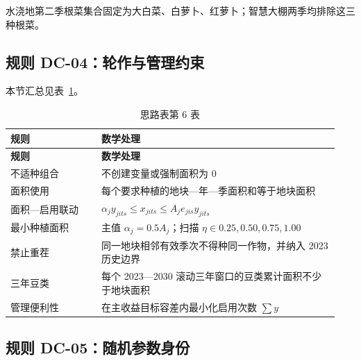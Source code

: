 \documentclass[UTF8,11pt,a4paper]{ctexart}
\begin{document}
水浇地第二季根菜集合固定为大白菜、白萝卜、红萝卜；智慧大棚两季均排除这三种根菜。

\subsection{规则 DC-04：轮作与管理约束}

\noindent 本节汇总见表~\ref{tab:thought-6}。
\begin{longtable}{@{}>{\raggedright\arraybackslash}p{0.26\linewidth}>{\raggedright\arraybackslash}p{0.68\linewidth}@{}}
\caption{思路表第 6 表}\label{tab:thought-6}\\
\toprule
\textbf{规则} & \textbf{数学处理} \\
\midrule
\endfirsthead
\toprule
\textbf{规则} & \textbf{数学处理} \\
\midrule
\endhead
不适种组合 & 不创建变量或强制面积为 0 \\
面积使用 & 每个要求种植的地块—年—季面积和等于地块面积 \\
面积—启用联动 & \(\alpha{}_{j} y_{jits} \leq{} x_{jits} \leq{} A_{j} e_{jis} y_{jits}\) \\
最小种植面积 & 主值 \(\alpha{}_{j}=0.5A_{j}\)；扫描 \(\eta{}\in{}{0.25,0.50,0.75,1.00}\) \\
禁止重茬 & 同一地块相邻有效季次不得种同一作物，并纳入 2023 历史边界 \\
三年豆类 & 每个 2023—2030 滚动三年窗口的豆类累计面积不少于地块面积 \\
管理便利性 & 在主收益目标容差内最小化启用次数 \(\sum{}y\) \\
\bottomrule
\end{longtable}

\subsection{规则 DC-05：随机参数身份}
\end{document}
